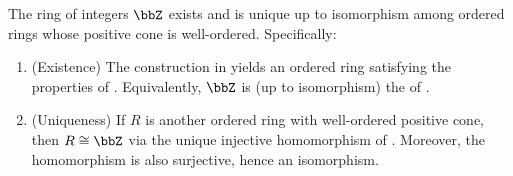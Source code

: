 \begin{corollary} \label{corollary:integers_existence_uniqueness}
    The ring of integers $\bbZ$ exists and is unique up to isomorphism among ordered rings whose positive cone is well-ordered. Specifically:
    \begin{enumerate}
        \item (Existence) The construction in  yields an ordered ring satisfying the properties of . Equivalently, $\bbZ$ is (up to isomorphism) the  of .

        \item (Uniqueness) If $R$ is another ordered ring with well-ordered positive cone, then $R \cong \bbZ$ via the unique injective homomorphism of . Moreover, the homomorphism is also surjective, hence an isomorphism.
    \end{enumerate}
\end{corollary}


